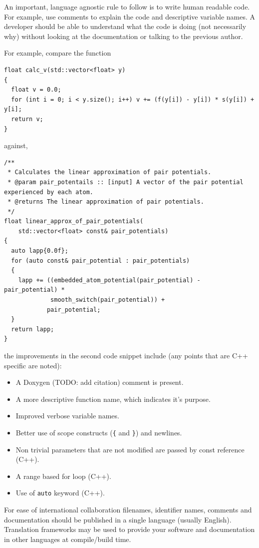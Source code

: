 \documentclass[jnr]{iosart2x}
\begin{document}
An important, language agnostic rule to follow is to write human readable code.
For example, use comments to explain the code and descriptive variable names.
A developer should be able to understand what the code is doing (not necessarily why) without looking at the documentation or talking to the previous author.

For example, compare the function \cite{Lim_2015}

\begin{lstlisting}
float calc_v(std::vector<float> y)
{
  float v = 0.0;
  for (int i = 0; i < y.size(); i++) v += (f(y[i]) - y[i]) * s(y[i]) + y[i];
  return v;
}
\end{lstlisting}

against,

\begin{lstlisting}
/**
 * Calculates the linear approximation of pair potentials.
 * @param pair_potentails :: [input] A vector of the pair potential experienced by each atom.
 * @returns The linear approximation of pair potentials.
 */
float linear_approx_of_pair_potentials(
    std::vector<float> const& pair_potentials)
{
  auto lapp{0.0f};
  for (auto const& pair_potential : pair_potentials)
  {
    lapp += ((embedded_atom_potential(pair_potential) - pair_potential) *
             smooth_switch(pair_potential)) +
            pair_potential;
  }
  return lapp;
}
\end{lstlisting}

the improvements in the second code snippet include (any points that are C++ specific are noted):
\begin{itemize}
  \item{A Doxygen \cite{} (TODO: add citation) comment is present.}
  \item{A more descriptive function name, which indicates it's purpose.}
  \item{Improved verbose variable names.}
  \item{Better use of scope constructs (\texttt{\{} and \texttt{\}}) and newlines.}
  \item{Non trivial parameters that are not modified are passed by const reference (C++).}
  \item{A range based for loop (C++).}
  \item{Use of \texttt{auto} keyword (C++).}
\end{itemize}

For ease of international collaboration filenames, identifier names, comments and documentation should be published in a single language (usually English).
Translation frameworks may be used to provide your software and documentation in other languages at compile/build time.
\end{document}
